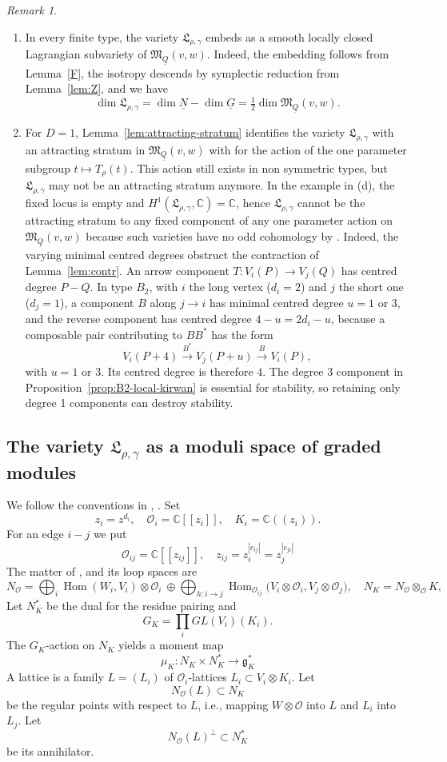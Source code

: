\documentclass[11pt,reqno]{amsart}
\theoremstyle{definition}
\theoremstyle{remark}
\newtheorem{Remark}[Theorem]{Remark}
\def\bbC{\mathbb C}
\def\dN{\underline N}
\def\dG{\underline G}
\def\dQ{\underline Q}
\providecommand{\calO}{\mathcal O}
\def\Hom{\operatorname{Hom}}
\newcommand{\llb}{[\![}
\newcommand{\rrb}{]\!]}
\newcommand{\llp}{(\!(}
\newcommand{\rrp}{)\!)}
\begin{document}
\begin{Remark}
\begin{enumerate}[label=$\mathrm{(\alph*)}$,leftmargin=8mm]
\item
In every finite type, the variety
$\mathfrak L_{\rho,\gamma}$
embeds as a smooth locally closed Lagrangian subvariety of $\mathfrak M_{\dQ}(v,w)$.
Indeed, the embedding follows from Lemma~\ref{F}, the isotropy descends by
symplectic reduction from Lemma~\ref{lem:Z}, and we have
\[
 \dim\mathfrak L_{\rho,\gamma}=\dim\dN-\dim\dG
 =\tfrac12\dim\mathfrak M_{\dQ}(v,w).
\]
\item 
For $D=1$, Lemma~\ref{lem:attracting-stratum} identifies the variety $\mathfrak L_{\rho,\gamma}$
with an attracting stratum in $\mathfrak M_{\dQ}(v,w)$ with for the action of the one parameter subgroup $t\mapsto T_\rho(t)$. 
This action still exists in non symmetric types, but
$\mathfrak L_{\rho,\gamma}$ may not be an attracting stratum anymore. 
In the example in (d), the fixed locus is empty and
$H^1(\mathfrak L_{\rho,\gamma},\bbC)=\bbC$, hence $\mathfrak L_{\rho,\gamma}$
cannot be the attracting stratum to any fixed component of any
one parameter action on $\mathfrak M_{\dQ}(v,w)$ because
such varieties have no odd cohomology by \cite{MN18}.
Indeed, the varying minimal centred degrees obstruct the contraction of
Lemma~\ref{lem:contr}. 
An arrow component $T:V_i(P)\to V_j(Q)$ has centred degree $P-Q$.
In type $B_2$, with $i$ the long vertex ($d_i=2$) and $j$ the short one ($d_j=1$),
a component $B$ along $j\to i$ has minimal centred degree
$u=1$ or $3$, and the reverse component has centred degree $4-u=2d_i-u$, because
a composable pair contributing to \(BB^*\) has the form 
$$V_i(P+4)\xrightarrow{B^*}V_j(P+u)\xrightarrow{B}V_i(P),$$ 
with \(u=1\) or \(3\). Its centred degree is therefore $4$.
The degree 3 component in Proposition~\ref{prop:B2-local-kirwan}
is essential for stability, so retaining only degree 1 components
can destroy stability. 
\end{enumerate}
\end{Remark}


\subsection{The variety $\mathfrak L_{\rho,\gamma}$ as a moduli space of graded modules}\label{subsec:ns-modules}
We follow the conventions in  \cite[\S2]{NW23},
\cite[\S3.1]{VVsh}.
Set
$$z_i=z^{d_i},\quad
\calO_i=\bbC\llb z_i\rrb
,\quad
K_i=\bbC\llp z_i\rrp.$$
For an edge $i-j$ we put  
$$\calO_{ij}=\bbC\llb z_{ij}\rrb,\quad z_{ij}=z_i^{|c_{ij}|}=z_j^{|c_{ji}|}$$ 
The matter of \cite{NW23}, \cite[(3.1.3)]{VVsh} and its loop spaces are
\[
N_\calO=\bigoplus_i\Hom(W_i,V_i)\otimes\calO_i\ \oplus\bigoplus_{h:i\to j}\Hom_{\calO_{ij}}\big(V_i\otimes\calO_i,V_j\otimes\calO_j\big),\quad N_K=N_\calO\otimes_{\calO}K,
\]
Let $N_K^*$ be the dual for the residue pairing and 
$$G_K=\prod_iGL(V_i)(K_i).$$
The $G_K$-action on $N_K$ yields a moment map
$$\mu_K:N_K\times N_K^*\to\mathfrak g_K^*$$ 
A {lattice} is a
family $L=(L_i)$ of $\calO_i$-lattices $L_i\subset V_i\otimes K_i$.
Let $$N_\calO(L)\subset N_K$$ be the regular points with respect to $L$, i.e., mapping $W\otimes\calO$ into $L$ and
$L_i$ into $L_j$. Let  
$$N_\calO(L)^\perp\subset N_K^*$$ be its annihilator.
\end{document}
